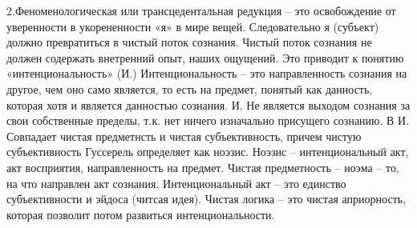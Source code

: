 \documentclass[12pt]{article}
\begin{document}
2.Феноменологическая или трансцедентальная редукция – это освобождение от уверенности в укорененности
«я» в мире вещей. Следовательно я (субъект) должно превратиться в чистый поток сознания.
Чистый поток сознания не должен содержать внетренний опыт, наших ощущений.
Это приводит к понятию «интенциональность» (И.)
Интенциональность – это направленность сознания на другое, чем оно само является, то есть на предмет,
понятый как данность, которая хотя и является данностью сознания. И. Не является выходом сознания за свои
собственные пределы, т.к. нет ничего изначально присущего сознанию. В И. Совпадает чистая предметнсть и
чистая субъективность, причем чистую субъективность Гуссерель определяет как ноэзис.
Ноэзис – интенциональный акт, акт восприятия, направленность на предмет.
Чистая предметность – ноэма – то, на что направлен акт сознания.
Интенциональный акт – это единство субъективности и эйдоса (читсая идея).
Чистая логика – это чистая априорность, которая позволит потом развиться интенциональности.

\newpage
\end{document}
